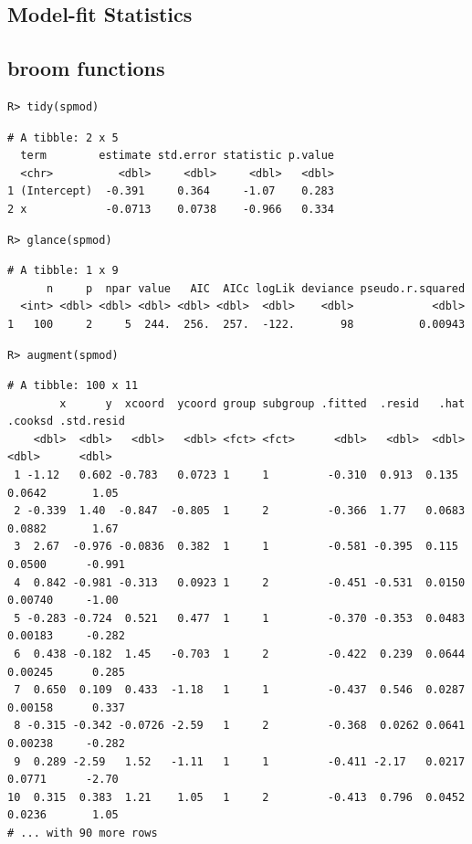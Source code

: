 \documentclass{article}
\begin{document}
\hypertarget{model-fit-statistics}{%
\subsection{Model-fit Statistics}\label{model-fit-statistics}}

\hypertarget{broom-functions}{%
\subsection{broom functions}\label{broom-functions}}

\begin{verbatim}
R> tidy(spmod)
\end{verbatim}

\begin{verbatim}
# A tibble: 2 x 5
  term        estimate std.error statistic p.value
  <chr>          <dbl>     <dbl>     <dbl>   <dbl>
1 (Intercept)  -0.391     0.364     -1.07    0.283
2 x            -0.0713    0.0738    -0.966   0.334
\end{verbatim}

\begin{verbatim}
R> glance(spmod)
\end{verbatim}

\begin{verbatim}
# A tibble: 1 x 9
      n     p  npar value   AIC  AICc logLik deviance pseudo.r.squared
  <int> <dbl> <dbl> <dbl> <dbl> <dbl>  <dbl>    <dbl>            <dbl>
1   100     2     5  244.  256.  257.  -122.       98          0.00943
\end{verbatim}

\begin{verbatim}
R> augment(spmod)
\end{verbatim}

\begin{verbatim}
# A tibble: 100 x 11
        x      y  xcoord  ycoord group subgroup .fitted  .resid   .hat .cooksd .std.resid
    <dbl>  <dbl>   <dbl>   <dbl> <fct> <fct>      <dbl>   <dbl>  <dbl>   <dbl>      <dbl>
 1 -1.12   0.602 -0.783   0.0723 1     1         -0.310  0.913  0.135  0.0642       1.05 
 2 -0.339  1.40  -0.847  -0.805  1     2         -0.366  1.77   0.0683 0.0882       1.67 
 3  2.67  -0.976 -0.0836  0.382  1     1         -0.581 -0.395  0.115  0.0500      -0.991
 4  0.842 -0.981 -0.313   0.0923 1     2         -0.451 -0.531  0.0150 0.00740     -1.00 
 5 -0.283 -0.724  0.521   0.477  1     1         -0.370 -0.353  0.0483 0.00183     -0.282
 6  0.438 -0.182  1.45   -0.703  1     2         -0.422  0.239  0.0644 0.00245      0.285
 7  0.650  0.109  0.433  -1.18   1     1         -0.437  0.546  0.0287 0.00158      0.337
 8 -0.315 -0.342 -0.0726 -2.59   1     2         -0.368  0.0262 0.0641 0.00238     -0.282
 9  0.289 -2.59   1.52   -1.11   1     1         -0.411 -2.17   0.0217 0.0771      -2.70 
10  0.315  0.383  1.21    1.05   1     2         -0.413  0.796  0.0452 0.0236       1.05 
# ... with 90 more rows
\end{verbatim}
\end{document}
